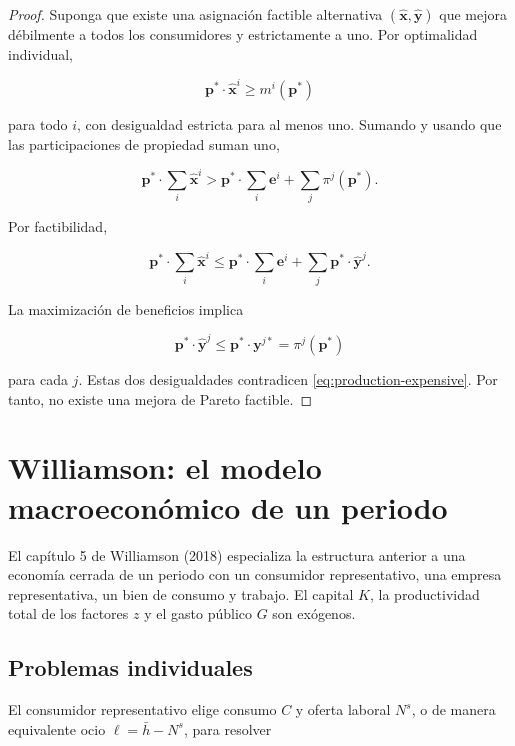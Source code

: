 \documentclass[12pt]{article}
\theoremstyle{cideplain}
\theoremstyle{cidedef}
\newcommand{\p}{\mathbf{p}}
\newcommand{\e}{\bm e}
\newcommand{\x}{\mathbf{x}}
\newcommand{\y}{\mathbf{y}}
\begin{document}
\begin{proof}
Suponga que existe una asignación factible alternativa
\((\widehat{\x},\widehat{\y})\) que mejora débilmente a todos los consumidores y
estrictamente a uno. Por optimalidad individual,

\[
  \p^*\cdot\widehat{\x}^i\geq m^i(\p^*)
\]

para todo \(i\), con desigualdad estricta para al menos uno. Sumando y usando que las
participaciones de propiedad suman uno,

\begin{equation}
  \p^*\cdot\sum_i\widehat{\x}^i
  >
  \p^*\cdot\sum_i\e^i+\sum_j\pi^j(\p^*).
  \label{eq:production-expensive}
\end{equation}

Por factibilidad,

\[
  \p^*\cdot\sum_i\widehat{\x}^i
  \leq
  \p^*\cdot\sum_i\e^i
  +\sum_j\p^*\cdot\widehat{\y}^j.
\]

La maximización de beneficios implica

\[
  \p^*\cdot\widehat{\y}^j
  \leq\p^*\cdot\y^{j*}
  =\pi^j(\p^*)
\]

para cada \(j\). Estas dos desigualdades contradicen
\eqref{eq:production-expensive}. Por tanto, no existe una mejora de Pareto factible.
\end{proof}

\section{Williamson: el modelo macroeconómico de un periodo}

El capítulo 5 de Williamson (2018) especializa la estructura anterior a una economía
cerrada de un periodo con un consumidor representativo, una empresa representativa, un
bien de consumo y trabajo. El capital \(K\), la productividad total de los factores \(z\) y
el gasto público \(G\) son exógenos.

\subsection{Problemas individuales}

El consumidor representativo elige consumo \(C\) y oferta laboral \(N^s\), o de manera
equivalente ocio \(\ell=\bar h-N^s\), para resolver
\end{document}
